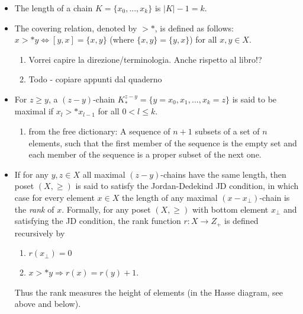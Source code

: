 \begin{itemize}
	\item The length of a chain $K = \{x_0,...,x_k\}$ is $|K|-1=k$.

	\item The covering relation, denoted by $>*$, is defined as follows: \\
	      $x>*y \Leftrightarrow [y,x]=\{x,y\}$ (where $\{x,y\} = \{y,x\}$) for all $x,y \in X$.
		  \begin{enumerate}
		   \item Vorrei capire la direzione/terminologia. Anche rispetto al libro!?
		   \item Todo - copiare appunti dal quaderno
		  \end{enumerate}
	\item For $z \ge y$, a $(z-y)$-chain $K_{*}^{z-y} = \{y=x_0, x_1, ..., x_k = z\}$ is said to be maximal if $x_l >* x_{l-1}$ for all $0 < l \le k$.
	    \begin{enumerate}
	     \item from the free dictionary: A sequence of $n+1$ subsets of a set of $n$ elements, such that the first member of the sequence is the empty set and each member of the sequence is a proper subset of the next one.
	    \end{enumerate}

	    
	\item If for any $y, z \in X$ all maximal $(z-y)$-chains have the same length, then poset $(X, \ge)$ is said to satisfy the Jordan-Dedekind JD condition, in which case for every element $x \in X$ the length of any maximal $(x-x_{\bot})$-chain is the \emph{rank} of $x$. Formally, for any poset $(X, \ge)$ with bottom element $x_{\bot}$ and satisfying the JD condition, the rank function $r: X \to Z_+$ is defined recursively by
	\begin{enumerate}
	 \item $r(x_{\bot}) = 0$
	 \item $x >* y \Rightarrow r(x) = r(y)+1$.
	\end{enumerate}
	Thus the rank measures the height of elements (in the Hasse diagram, see above and below).


\end{itemize}

